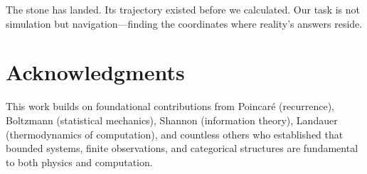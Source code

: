 \documentclass[twocolumn,10pt]{article}
\begin{document}
The stone has landed. Its trajectory existed before we calculated. Our task is not simulation but navigation—finding the coordinates where reality's answers reside.

\section*{Acknowledgments}

This work builds on foundational contributions from Poincaré (recurrence), Boltzmann (statistical mechanics), Shannon (information theory), Landauer (thermodynamics of computation), and countless others who established that bounded systems, finite observations, and categorical structures are fundamental to both physics and computation.



\end{document}

